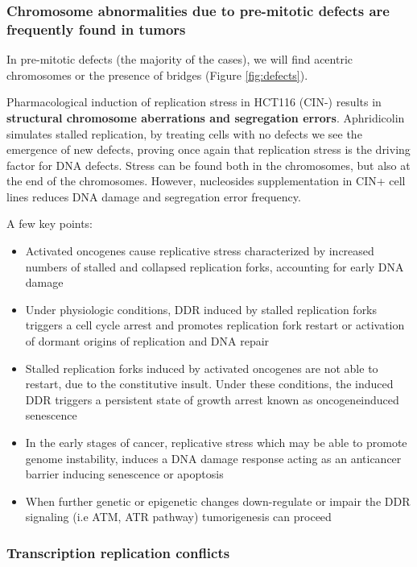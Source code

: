 \hypertarget{chromosome-abnormalities-due-to-pre-mitotic-defects-are-frequently-found-in-tumors}{%
\subsubsection{Chromosome abnormalities due to pre-mitotic defects are
frequently found in
tumors}\label{chromosome-abnormalities-due-to-pre-mitotic-defects-are-frequently-found-in-tumors}}

In pre-mitotic defects (the majority of the cases),  we will find acentric chromosomes or the presence of bridges (Figure \ref{fig:defects}).

Pharmacological induction of replication stress in HCT116 (CIN-) results
in \textbf{structural chromosome aberrations and segregation errors}.
Aphridicolin simulates stalled replication, by treating cells with no
defects we see the emergence of new defects, proving once again that
replication stress is the driving factor for DNA defects. Stress can be
found both in the chromosomes, but also at the end of the chromosomes.
However, nucleosides supplementation in CIN+ cell lines reduces DNA damage
and segregation error frequency.

A few key points: 
\begin{itemize}
\tightlist
\item Activated oncogenes cause replicative stress
characterized by increased numbers of stalled and collapsed replication
forks, accounting for early DNA damage
\item Under physiologic conditions,
DDR induced by stalled replication forks triggers a cell cycle arrest
and promotes replication fork restart or activation of dormant origins
of replication and DNA repair
\item Stalled replication forks induced by
activated oncogenes are not able to restart, due to the constitutive
insult. Under these conditions, the induced DDR triggers a persistent
state of growth arrest known as oncogeneinduced senescence
\item In the
early stages of cancer, replicative stress which may be able to promote
genome instability, induces a DNA damage response acting as an
anticancer barrier inducing senescence or apoptosis
\item When further
genetic or epigenetic changes down-regulate or impair the DDR signaling
(i.e ATM, ATR pathway) tumorigenesis can proceed
\end{itemize}

\hypertarget{transcription-replication-conflicts}{%
\subsubsection{Transcription replication
conflicts}\label{transcription-replication-conflicts}}

